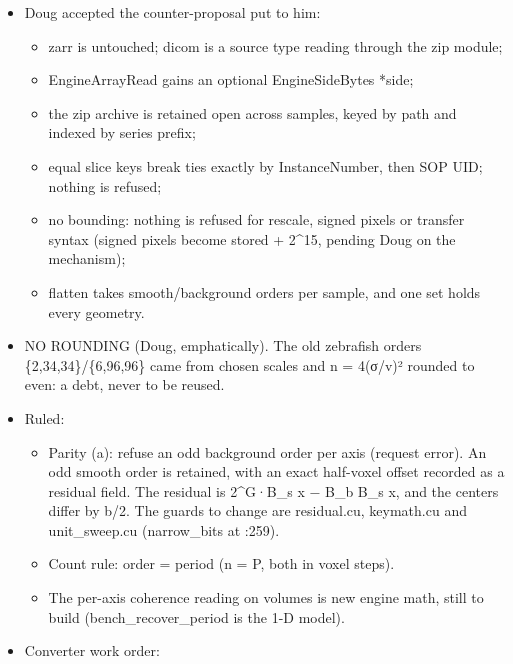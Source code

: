 \begin{itemize}
\begin{itemize}
\item sections in order of how often they're read (the file is read FIFO): head and geometry, then pixel offsets and stream, then deflated DICOM header bytes (which engine\_\allowbreak{}iapx\_\allowbreak{}load passes back), then the member list;
\item CRC-64 per part, with no zip CRC-32 rejoin.
\end{itemize}
\item Doug accepted the counter-proposal put to him:

\begin{itemize}
\item zarr is untouched; dicom is a source type reading through the zip module;
\item EngineArrayRead gains an optional EngineSideBytes *side;
\item the zip archive is retained open across samples, keyed by path and indexed by series prefix;
\item equal slice keys break ties exactly by InstanceNumber, then SOP UID; nothing is refused;
\item no bounding: nothing is refused for rescale, signed pixels or transfer syntax (signed pixels become stored + 2\textasciicircum{}15, pending Doug on the mechanism);
\item flatten takes smooth/background orders per sample, and one set holds every geometry.
\end{itemize}
\item NO ROUNDING (Doug, emphatically). The old zebrafish orders \{2,34,34\}/\{6,96,96\} came from chosen scales and n = 4(σ/v)² rounded to even: a debt, never to be reused.
\item Ruled:

\begin{itemize}
\item Parity (a): refuse an odd background order per axis (request error). An odd smooth order is retained, with an exact half-voxel offset recorded as a residual field. The residual is 2\textasciicircum{}G·B\_\allowbreak{}s x − B\_\allowbreak{}b B\_\allowbreak{}s x, and the centers differ by b/2. The guards to change are residual.cu, keymath.cu and unit\_\allowbreak{}sweep.cu (narrow\_\allowbreak{}bits at :259).
\item Count rule: order = period (n = P, both in voxel steps).
\item The per-axis coherence reading on volumes is new engine math, still to build (bench\_\allowbreak{}recover\_\allowbreak{}period is the 1-D model).
\end{itemize}
\item Converter work order:


\end{itemize}
